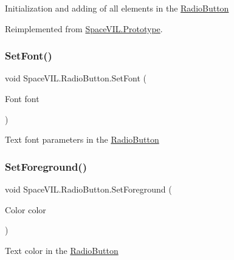 Initialization and adding of all elements in the \mbox{\hyperlink{class_space_v_i_l_1_1_radio_button}{Radio\+Button}} 



Reimplemented from \mbox{\hyperlink{class_space_v_i_l_1_1_prototype_ac3379fe02923ee155b5b0084abf27420}{Space\+V\+I\+L.\+Prototype}}.

\mbox{\label{class_space_v_i_l_1_1_radio_button_a58468eb198714c58266c4a88cb856ebe}} 
\subsubsection{\texorpdfstring{Set\+Font()}{SetFont()}}
{\footnotesize\ttfamily void Space\+V\+I\+L.\+Radio\+Button.\+Set\+Font (\begin{DoxyParamCaption}\item[{Font}]{font }\end{DoxyParamCaption})\hspace{0.3cm}{\ttfamily [inline]}}



Text font parameters in the \mbox{\hyperlink{class_space_v_i_l_1_1_radio_button}{Radio\+Button}} 

\mbox{\label{class_space_v_i_l_1_1_radio_button_a473085ed46d316aab157cd78d495f053}} 
\subsubsection{\texorpdfstring{Set\+Foreground()}{SetForeground()}}
{\footnotesize\ttfamily void Space\+V\+I\+L.\+Radio\+Button.\+Set\+Foreground (\begin{DoxyParamCaption}\item[{Color}]{color }\end{DoxyParamCaption})\hspace{0.3cm}{\ttfamily [inline]}}



Text color in the \mbox{\hyperlink{class_space_v_i_l_1_1_radio_button}{Radio\+Button}} 

